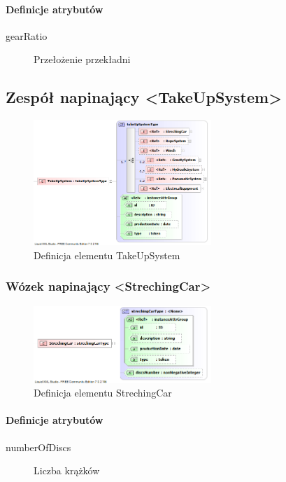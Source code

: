 \documentclass[12pt,a4paper]{article}
\begin{document}
\paragraph{Definicje atrybutów}
\begin{description}
\item[gearRatio] Przełożenie przekładni
\end{description}


\subsection{Zespół napinający <TakeUpSystem>}

\begin{figure}[H]
  \centering
  \includegraphics[width=0.6\textwidth]{png/liquid/TakeUpSystem}
  \caption{Definicja elementu TakeUpSystem}
  \label{fig:takeUpSystem-xsd}
\end{figure}


\subsubsection{Wózek napinający <StrechingCar>}

\begin{figure}[H]
  \centering
  \includegraphics[width=0.6\textwidth]{png/liquid/StrechingCar}
  \caption{Definicja elementu StrechingCar}
  \label{fig:strechingCar-xsd}
\end{figure}

\paragraph{Definicje atrybutów}
\begin{description}
\item[numberOfDiscs] Liczba krążków
\end{description}
\end{document}
